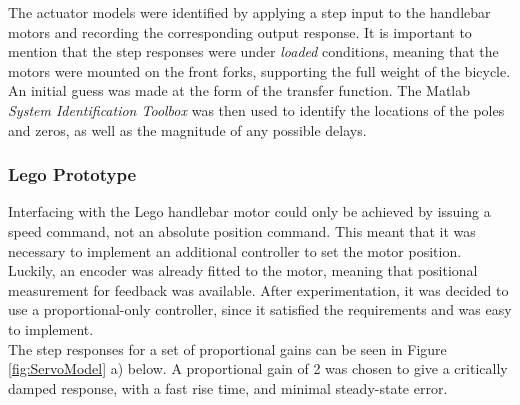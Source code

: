 The actuator models were identified by applying a step input to the handlebar motors and recording the corresponding output response. It is important to mention that the step responses were under \textit{loaded} conditions, meaning that the motors were mounted on the front forks, supporting the full weight of the bicycle. \\

An initial guess was made at the form of the transfer function. The Matlab \textit{System Identification Toolbox} was then used to identify the locations of the poles and zeros, as well as the magnitude of any possible delays.

\subsubsection{Lego Prototype}
Interfacing with the Lego handlebar motor could only be achieved by issuing a speed command, not an absolute position command. This meant that it was necessary to implement an additional controller to set the motor position. Luckily, an encoder was already fitted to the motor, meaning that positional measurement for feedback was available. After experimentation, it was decided to use a proportional-only controller, since it satisfied the requirements and was easy to implement. \\

The step responses for a set of proportional gains can be seen in Figure \ref{fig:ServoModel} a) below. A proportional gain of 2 was chosen to give a critically damped response, with a fast rise time, and minimal steady-state error. \\

